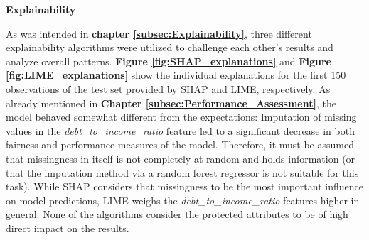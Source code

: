 \textbf{Explainability}

As was intended in \textbf{chapter \ref{subsec:Explainability}}, three different explainability algorithms were utilized to challenge each other's results and analyze overall patterns. \textbf{Figure \ref{fig:SHAP_explanations}} and \textbf{Figure \ref{fig:LIME_explanations}} show the individual explanations for the first 150 observations of the test set provided by SHAP and LIME, respectively. 
As already mentioned in \textbf{Chapter \ref{subsec:Performance_Assessment}}, the model behaved somewhat different from the expectations: Imputation of missing values in the \textit{debt\_to\_income\_ratio} feature led to a significant decrease in both fairness and performance measures of the model.
Therefore, it must be assumed that missingness in itself is not completely at random and holds information (or that the imputation method via a random forest regressor is not suitable for this task).
While SHAP considers that missingness to be the most important influence on model predictions, LIME weighs the \textit{debt\_to\_income\_ratio} features higher in general.
None of the algorithms consider the protected attributes to be of high direct impact on the results.

